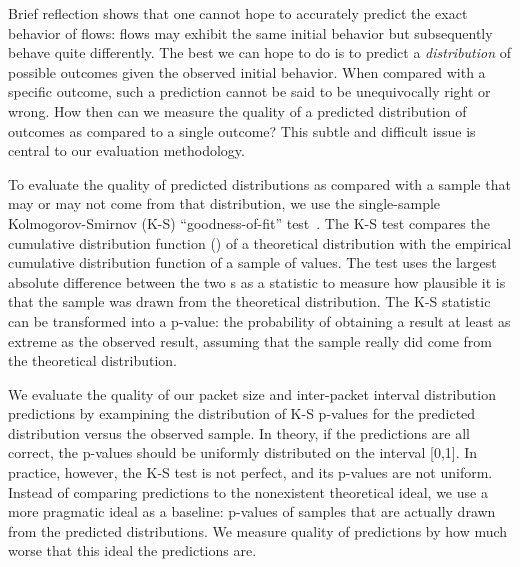 \documentclass[conference]{IEEEtran}
\begin{document}
Brief reflection shows that one cannot hope to accurately predict the exact behavior of flows:
flows may exhibit the same initial behavior but subsequently behave quite differently.
The best we can hope to do is to predict a \emph{distribution} of possible outcomes given the observed initial behavior.
When compared with a specific outcome, such a prediction cannot be said to be unequivocally right or wrong.
How then can we measure the quality of a predicted distribution of outcomes as compared to a single outcome?
This subtle and difficult issue is central to our evaluation methodology.


To evaluate the quality of predicted distributions as compared with a sample that may or may not come from that distribution, we use the single-sample Kolmogorov-Smirnov (K-S) ``goodness-of-fit'' test~\cite{Feller68}.
The K-S test compares the cumulative distribution function () of a theoretical distribution with the empirical cumulative distribution function of a sample of values.
The test uses the largest absolute difference between the two s as a statistic to measure how plausible it is that the sample was drawn from the theoretical distribution.
The K-S statistic can be transformed into a p-value:
the probability of obtaining a result at least as extreme as the observed result, assuming that the sample really did come from the theoretical distribution.


We evaluate the quality of our packet size and inter-packet interval distribution predictions by exampining the distribution of K-S p-values for the predicted distribution versus the observed sample.
In theory, if the predictions are all correct, the p-values should be uniformly distributed on the interval [0,1].
In practice, however, the K-S test is not perfect, and its p-values are not uniform.
Instead of comparing predictions to the nonexistent theoretical ideal, we use a more pragmatic ideal as a baseline:
p-values of samples that are actually drawn from the predicted distributions.
We measure quality of predictions by how much worse that this ideal the predictions are.\ksidealnote
\end{document}
